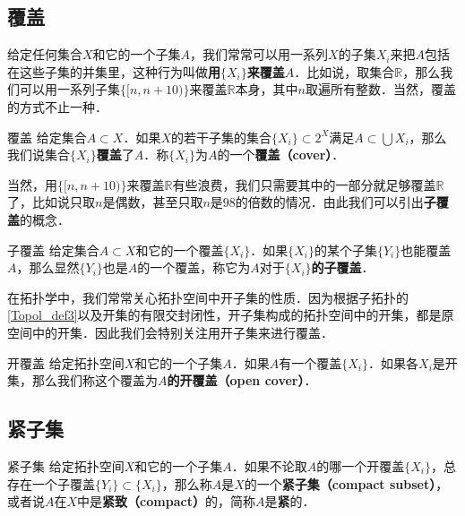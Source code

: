\subsection{覆盖}

给定任何集合$X$和它的一个子集$A$，我们常常可以用一系列$X$的子集$X_i$来把$A$包括在这些子集的并集里，这种行为叫做\textbf{用$\{X_i\}$来覆盖$A$}．比如说，取集合$\mathbb{R}$，那么我们可以用一系列子集$\{[n, n+10)\}$来覆盖$\mathbb{R}$本身，其中$n$取遍所有整数．当然，覆盖的方式不止一种．

\begin{definition}{覆盖}
给定集合$A\subset X$．如果$X$的若干子集的集合$\{X_i\}\subset 2^X$满足$A\subset\bigcup X_i$，那么我们说集合$\{X_i\}$\textbf{覆盖}了$A$．称$\{X_i\}$为$A$的一个\textbf{覆盖（cover）}．
\end{definition}

当然，用$\{[n, n+10)\}$来覆盖$\mathbb{R}$有些浪费，我们只需要其中的一部分就足够覆盖$\mathbb{R}$了，比如说只取$n$是偶数，甚至只取$n$是$98$的倍数的情况．由此我们可以引出\textbf{子覆盖}的概念．

\begin{definition}{子覆盖}
给定集合$A\subset X$和它的一个覆盖$\{X_i\}$．如果$\{X_i\}$的某个子集$\{Y_i\}$也能覆盖$A$，那么显然$\{Y_i\}$也是$A$的一个覆盖，称它为\textbf{$A对于\{X_i\}$的子覆盖}．
\end{definition}

在拓扑学中，我们常常关心拓扑空间中开子集的性质．因为根据子拓扑的\autoref{Topol_def3}以及开集的有限交封闭性，开子集构成的拓扑空间中的开集，都是原空间中的开集．因此我们会特别关注用开子集来进行覆盖．

\begin{definition}{开覆盖}
给定拓扑空间$X$和它的一个子集$A$．如果$A$有一个覆盖$\{X_i\}$．如果各$X_i$是开集，那么我们称这个覆盖为\textbf{$A$的开覆盖（open cover）}．
\end{definition}

\subsection{紧子集}

\begin{definition}{紧子集}\label{Topo2_def1}
给定拓扑空间$X$和它的一个子集$A$．如果不论取$A$的哪一个开覆盖$\{X_i\}$，总存在一个子覆盖$\{Y_i\}\subset \{X_i\}$，那么称$A$是$X$的一个\textbf{紧子集（compact subset）}，或者说$A$在$X$中是\textbf{紧致（compact）}的，简称$A$是\textbf{紧}的．
\end{definition}

